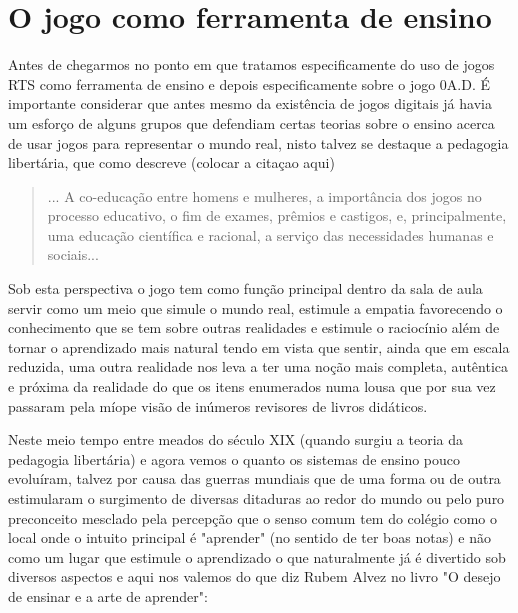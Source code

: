 \documentclass[article,11pt, a4paper,sumario=tradicional]{abntex2}
\begin{document}
\section{O jogo como ferramenta de ensino}
    Antes de chegarmos no ponto em que tratamos especificamente do uso de jogos RTS como ferramenta de ensino e depois especificamente sobre o jogo 0A.D. É importante considerar que antes mesmo da existência de jogos digitais já havia um esforço  de alguns grupos que defendiam certas teorias sobre o ensino acerca de usar jogos para representar o mundo real, nisto talvez se destaque a pedagogia libertária, que como descreve (colocar a citaçao aqui)
    \begin{quote}
    	... A co-educação entre homens e mulheres, a importância dos jogos no processo educativo, o fim de exames, prêmios e castigos, e, principalmente, uma	educação científica e racional, a serviço das necessidades humanas e sociais...
    \end{quote}
    
    Sob esta perspectiva o jogo tem como função principal dentro da sala de aula servir como um meio que simule o mundo real, estimule a empatia favorecendo o conhecimento que se tem sobre outras realidades  e estimule o raciocínio além de tornar o aprendizado mais natural tendo em vista que sentir, ainda que em escala reduzida, uma outra realidade nos leva a ter uma noção mais completa, autêntica e próxima da realidade do que os itens enumerados numa lousa que por sua vez passaram pela míope visão de inúmeros revisores de livros didáticos.

    Neste meio tempo entre meados do século XIX (quando surgiu a teoria da pedagogia libertária) e agora vemos o quanto os sistemas de ensino pouco evoluíram, talvez por causa das guerras mundiais que de uma forma ou de outra estimularam o surgimento de diversas ditaduras ao redor do mundo ou pelo puro preconceito mesclado pela percepção que o senso comum tem do colégio como o local onde o intuito principal é "aprender" (no sentido de ter boas notas) e não como um lugar que estimule o aprendizado o que naturalmente já é divertido sob diversos aspectos e aqui nos valemos do que diz Rubem Alvez no livro "O desejo de ensinar e a arte de aprender":
\end{document}
